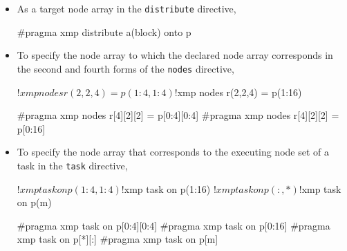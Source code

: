 \begin{itemize}
\item As a target node array in the {\tt distribute} directive,\\

\begin{minipage}{0.43\hsize}
\begin{center}
\end{center}
\end{minipage}
%
\begin{minipage}{0.54\hsize}
\begin{center}
\begin{XCexampleR}
#pragma xmp distribute a(block) onto p
\end{XCexampleR}
\end{center}
\end{minipage}

\item To specify the node array to which the declared node array corresponds
      in the second and fourth forms of the {\tt nodes} directive,\\

\begin{minipage}{0.43\hsize}
\begin{center}
\begin{XFexample}
!$xmp nodes r(2,2,4) = p(1:4,1:4)
!$xmp nodes r(2,2,4) = p(1:16)
\end{XFexample}
\end{center}
\end{minipage}
%
\begin{minipage}{0.54\hsize}
\begin{center}
\begin{XCexampleR}
#pragma xmp nodes r[4][2][2] = p[0:4][0:4]
#pragma xmp nodes r[4][2][2] = p[0:16]
\end{XCexampleR}
\end{center}
\end{minipage}

\item To specify the node array that corresponds to the executing node set
      of a task in the {\tt task} directive,

\begin{minipage}{0.43\hsize}
\begin{center}
\begin{XFexample}
!$xmp task on p(1:4,1:4)
!$xmp task on p(1:16)
!$xmp task on p(:,*)
!$xmp task on p(m)
\end{XFexample}
\end{center}
\end{minipage}
%
\begin{minipage}{0.54\hsize}
\begin{center}
\begin{XCexampleR}
#pragma xmp task on p[0:4][0:4]
#pragma xmp task on p[0:16]
#pragma xmp task on p[*][:]
#pragma xmp task on p[m]
\end{XCexampleR}
\end{center}
\end{minipage}


\end{itemize}
